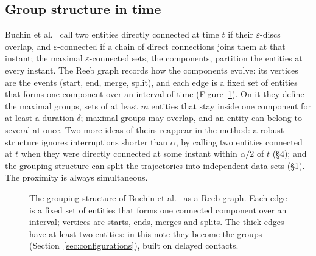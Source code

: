 \subsection{Group structure in time}

Buchin et al.~\cite{buchin2015} call two entities directly connected at time $t$ if their
$\varepsilon$-discs overlap, and $\varepsilon$-connected if a chain of direct connections joins
them at that instant; the maximal $\varepsilon$-connected sets, the components, partition the
entities at every instant. The Reeb graph records how the components evolve: its vertices are the
events (start, end, merge, split), and each edge is a fixed set of entities that forms one
component over an interval of time (Figure~\ref{fig:reeb}). On it they define the maximal groups,
sets of at least $m$ entities that stay inside one component for at least a duration $\delta$;
maximal groups may overlap, and an entity can belong to several at once. Two more ideas of theirs
reappear in the method: a robust structure ignores interruptions shorter than $\alpha$, by calling two
entities connected at $t$ when they were directly connected at some instant within $\alpha/2$ of
$t$ (§4); and the grouping structure can split the trajectories into independent data sets
(§1). The proximity is always simultaneous.

\begin{figure}
\centering
{}
\caption{The grouping structure of Buchin et al.~\cite{buchin2015} as a Reeb graph. Each edge is a
fixed set of entities that forms one connected component over an interval; vertices are starts,
ends, merges and splits. The thick edges have at least two entities: in this note they become the
groups (Section~\ref{sec:configurations}), built on delayed contacts.}
\label{fig:reeb}
\end{figure}

